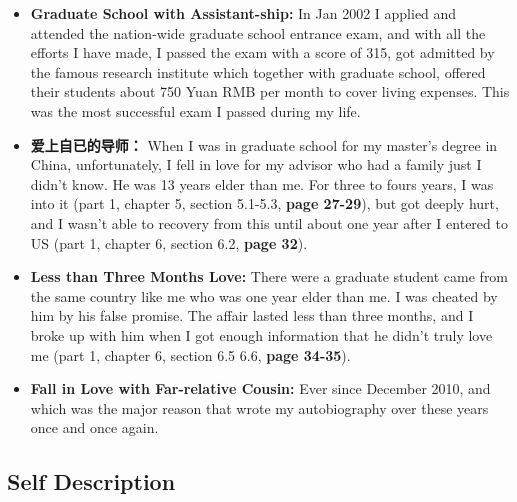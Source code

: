 \documentclass[9pt,b5paper]{article}
\begin{document}
\begin{itemize}
\item \textbf{Graduate School with Assistant-ship:} In Jan 2002 I applied and attended the nation-wide graduate school entrance exam, and with all the efforts I have made, I passed the exam with a score of 315, got admitted by the famous research institute which together with graduate school, offered their students about 750 Yuan RMB per month to cover living expenses. This was the most successful exam I passed during my life.
\item \textbf{爱上自已的导师：} When I was in graduate school for my master's degree in China, unfortunately, I fell in love for my advisor who had a family just I didn't know. He was 13 years elder than me. For three to fours years, I was into it (part 1, chapter 5, section 5.1-5.3, \textbf{page 27-29}), but  got deeply hurt, and I wasn't able to recovery from this until about one year after I entered to US (part 1, chapter 6, section 6.2, \textbf{page 32}).
\item \textbf{Less than Three Months Love:} There were a graduate student came from the same country like me who was one year elder than me. I was cheated by him by his false promise. The affair lasted less than three months, and I broke up with him when I got enough information that he didn't truly love me (part 1, chapter 6, section 6.5 6.6, \textbf{page 34-35}).
\item \textbf{Fall in Love with Far-relative Cousin:} Ever since December 2010, and which was the major reason that wrote my autobiography over these years once and once again.
\end{itemize}

\subsection{Self Description}
\label{sec-9-2}
\end{document}
